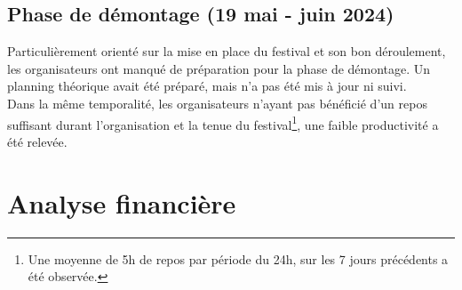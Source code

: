 \documentclass[12pt,a4paper]{report}
\begin{document}
\section{Phase de démontage (19 mai - juin 2024)}

Particulièrement orienté sur la mise en place du festival et son bon déroulement, les organisateurs ont manqué de préparation pour la phase de démontage. Un planning théorique avait été préparé, mais n'a pas été mis à jour ni suivi.\\

Dans la même temporalité, les organisateurs n'ayant pas bénéficié d'un repos suffisant durant l'organisation et la tenue du festival\footnote{Une moyenne de 5h de repos par période du 24h, sur les 7 jours précédents a été observée.}, une faible productivité a été relevée.

\chapter{Analyse financière}

%
%
%
%
%
%
\end{document}
